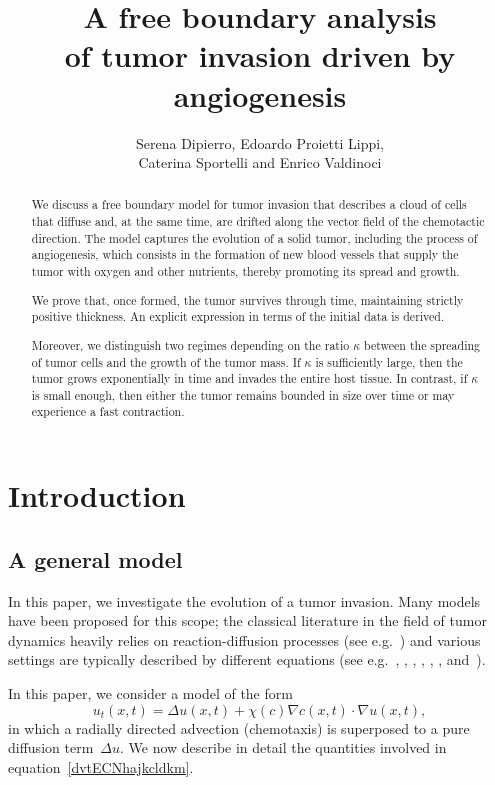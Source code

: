 \documentclass[12pt,a4paper,intlimits,sumlimits]{amsart}
\title[Free boundary analysis for tumor invasion]{A free boundary analysis \\ of tumor invasion driven by angiogenesis}
\author[S. Dipierro, E. Proietti Lippi, C. Sportelli and E. Valdinoci]{Serena Dipierro, Edoardo Proietti Lippi, \\Caterina Sportelli and Enrico Valdinoci}
\date{}
\theoremstyle{definition}
\theoremstyle{plain}
\numberwithin{equation}{section}
\begin{document}
\begin{abstract}
We discuss a free boundary model for tumor invasion that describes a cloud of cells that diffuse and, at the same time, are drifted along the vector field of the chemotactic direction.  The model captures the evolution of a solid tumor, including the process of angiogenesis, which consists in the formation of new blood vessels that supply the tumor with oxygen and other nutrients, thereby promoting its spread and growth.

We prove that, once formed,  the tumor survives through time, maintaining strictly positive thickness. An explicit expression in terms of the initial data is derived. 

Moreover, we distinguish two regimes depending on the ratio $\kappa$ between the spreading of tumor cells and the growth of the tumor mass. If $\kappa$ is sufficiently large, then the tumor grows exponentially in time and invades the entire host tissue. In contrast, if $\kappa$ is small enough, then either the tumor remains bounded in size over time or may experience a fast contraction.
 \end{abstract}
 \maketitle

\tableofcontents
  
\section{Introduction} \label{Intro}
\subsection{A general model}\label{INT1.1}
In this paper, we investigate the evolution of a tumor invasion.
Many models have been proposed for this scope;
the classical literature in the field of tumor dynamics heavily relies on reaction-diffusion processes (see e.g.~\cite{MR1684873, MR1920634, MR3401608}) and
various settings are typically described by different equations
(see e.g.~\cite[equations~(3.1a) and~(5.1)]{ARM06},
\cite[equations~(1) and~(2)]{MR3022677.13}, \cite[equation~(1.1)]{MR3260704.14},
\cite[equations~(1.1) and~(1.2)]{2020nonlocalcelladhesionmodels},
\cite[equation~(6.3)]{AC22}, \cite[equation~(37.2)]{MRELE}, and~\cite[equations~(2) and~(3)]{abderrahman2025optimalcontrolmedicaldrug25}).

In this paper, we  consider a model of the form
\begin{equation}\label{dvtECNhajkcldkm}
u_t(x, t) = \Delta u(x, t) + \chi(c) \nabla c(x, t)\cdot\nabla u(x, t), %
\end{equation}
in which a radially directed advection (chemotaxis) is superposed to a pure diffusion term~$\Delta u$. 
We now describe in detail the quantities involved
in equation~\eqref{dvtECNhajkcldkm}.
\end{document}
